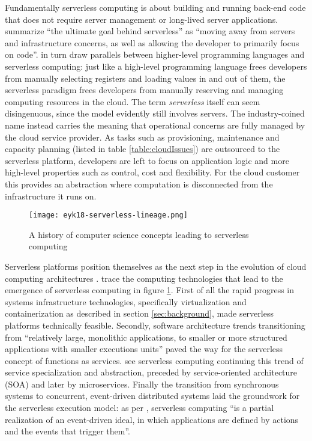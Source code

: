Fundamentally serverless computing is about building and running back-end code that does not require server management or long-lived server applications. \textcite{sbarski2017serverless} summarize ``the ultimate goal behind serverless'' as ``moving away from servers and infrastructure concerns, as well as allowing the developer to primarily focus on code''. \textcite{jonas19berkeleyView} in turn draw parallels between higher-level programming languages and serverless computing: just like a high-level programming language frees developers from manually selecting registers and loading values in and out of them, the serverless paradigm frees developers from manually reserving and managing computing resources in the cloud. The term \textit{serverless} itself can seem disingenuous, since the model evidently still involves servers. The industry-coined name instead carries the meaning that operational concerns are fully managed by the cloud service provider. As tasks such as provisioning, maintenance and capacity planning (listed in table \ref{table:cloudIssues}) are outsourced to the serverless platform, developers are left to focus on application logic and more high-level properties such as control, cost and flexibility. For the cloud customer this provides an abstraction where computation is disconnected from the infrastructure it runs on. \parencite{robert2016serverlessarchitectures,cncf18serverlessWG}

\begin{figure}[h]
  \centering
  \texttt{[image: eyk18-serverless-lineage.png]}
  \caption{A history of computer science concepts leading to serverless computing \parencite{van18fromPAAStoPresent}}
  \label{fig:serverlessLineage}
\end{figure}

Serverless platforms position themselves as the next step in the evolution of cloud computing architectures \parencite{baldini17currentTrends}. \textcite{van18fromPAAStoPresent} trace the computing technologies that lead to the emergence of serverless computing in figure \ref{fig:serverlessLineage}. First of all the rapid progress in systems infrastructure technologies, specifically virtualization and containerization as described in section \ref{sec:background}, made serverless platforms technically feasible. Secondly, software architecture trends transitioning from ``relatively large, monolithic applications, to smaller or more structured applications with smaller executions units'' \parencite{van2017spec} paved the way for the serverless concept of functions as services. \textcite{van18fromPAAStoPresent} see serverless computing continuing this trend of service specialization and abstraction, preceded by service-oriented architecture (SOA) and later by microservices. Finally the transition from synchronous systems to concurrent, event-driven distributed systems laid the groundwork for the serverless execution model: as per \textcite{mcgrath17implement}, serverless computing ``is a partial realization of an event-driven ideal, in which applications are defined by actions and the events that trigger them''.

